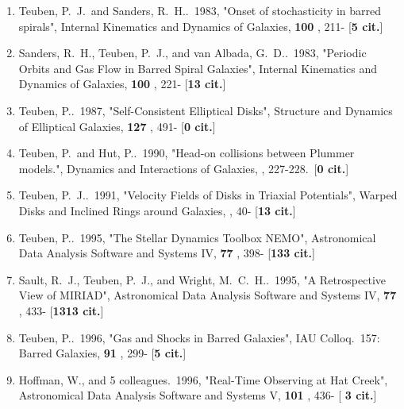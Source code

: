 \documentclass[11pt,letterpaper]{article}
\begin{document}
\begin{enumerate}[resume,label=\textbf{\arabic*}.]


\item  
Teuben, P.~J.~and Sanders, R.~H..\  1983,  "Onset of stochasticity in 
barred spirals", Internal Kinematics and Dynamics of Galaxies,  {\bf 100} , 
211- [{\bf 5 cit.}] 

\item  
Sanders, R.~H., Teuben, P.~J., and van Albada, G.~D..\  1983,  "Periodic 
Orbits and Gas Flow in Barred Spiral Galaxies", Internal Kinematics and 
Dynamics of Galaxies,  {\bf 100} , 221- [{\bf 13 cit.}] 

\item  
Teuben, P..\  1987,  "Self-Consistent Elliptical Disks", Structure and 
Dynamics of Elliptical Galaxies,  {\bf 127} , 491- [{\bf 0 cit.}] 


\item  
Teuben, P.~and Hut, P..\  1990,  "Head-on collisions between Plummer 
models.", Dynamics and Interactions of Galaxies,  , 227-228.\  [{\bf 0 
cit.}] 

\item  
Teuben, P.~J..\  1991,  "Velocity Fields of Disks in Triaxial Potentials", 
Warped Disks and Inclined Rings around Galaxies,  , 40- [{\bf 13 cit.}] 





\item  
Teuben, P..\  1995,  "The Stellar Dynamics Toolbox NEMO", Astronomical Data 
Analysis Software and Systems IV,  {\bf 77} , 398- [{\bf 133 cit.}] 

\item  
Sault, R.~J., Teuben, P.~J., and Wright, M.~C.~H..\  1995,  "A 
Retrospective View of MIRIAD", Astronomical Data Analysis Software and 
Systems IV,  {\bf 77} , 433- [{\bf 1313 cit.}] 

\item  
Teuben, P..\  1996,  "Gas and Shocks in Barred Galaxies", IAU Colloq.~157: 
Barred Galaxies,  {\bf 91} , 299- [{\bf 5 cit.}] 

\item  
Hoffman, W., and 5 colleagues.\  1996,  "Real-Time Observing at Hat Creek", 
Astronomical Data Analysis Software and Systems V,  {\bf 101} , 436- [{\bf 
3 cit.}] 





\end{enumerate}
\end{document}
